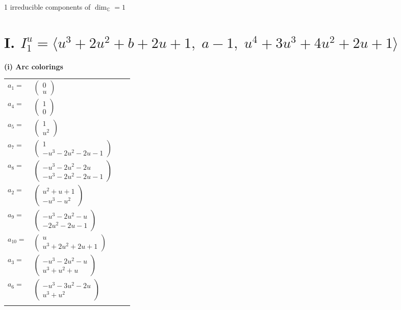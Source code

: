 \documentclass[1p]{elsarticle_modified}
\theoremstyle{definition}
\begin{document}
\raggedright * 1 irreducible components of $\dim_{\mathbb{C}}=1$ \\
\newpage
\renewcommand{\arraystretch}{1}
\centering \section*{I. $I^u_{1}= \langle u^3+2 u^2+b+2 u+1,\;a-1,\;u^4+3 u^3+4 u^2+2 u+1 \rangle$}
\flushleft \textbf{(i) Arc colorings}\\
\begin{tabular}{m{7pt} m{180pt} m{7pt} m{180pt} }
\flushright $a_{1}=$&$\begin{pmatrix}0\\u\end{pmatrix}$ \\
\flushright $a_{4}=$&$\begin{pmatrix}1\\0\end{pmatrix}$ \\
\flushright $a_{5}=$&$\begin{pmatrix}1\\u^2\end{pmatrix}$ \\
\flushright $a_{7}=$&$\begin{pmatrix}1\\- u^3-2 u^2-2 u-1\end{pmatrix}$ \\
\flushright $a_{8}=$&$\begin{pmatrix}- u^3-2 u^2-2 u\\- u^3-2 u^2-2 u-1\end{pmatrix}$ \\
\flushright $a_{2}=$&$\begin{pmatrix}u^2+u+1\\- u^3- u^2\end{pmatrix}$ \\
\flushright $a_{9}=$&$\begin{pmatrix}- u^3-2 u^2- u\\-2 u^2-2 u-1\end{pmatrix}$ \\
\flushright $a_{10}=$&$\begin{pmatrix}u\\u^3+2 u^2+2 u+1\end{pmatrix}$ \\
\flushright $a_{3}=$&$\begin{pmatrix}- u^3-2 u^2- u\\u^3+u^2+u\end{pmatrix}$ \\
\flushright $a_{6}=$&$\begin{pmatrix}- u^3-3 u^2-2 u\\u^3+u^2\end{pmatrix}$\\&\end{tabular}
\end{document}
